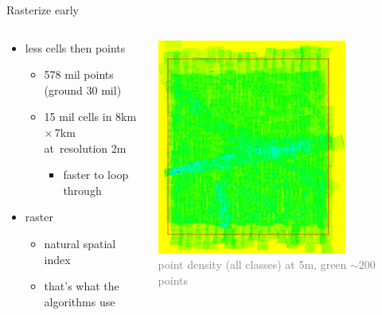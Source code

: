 \documentclass[xcolor={dvipsnames,usenames},beamer,aspectratio=169]{beamer}
\begin{document}
\begin{frame}{Rasterize early}

\begin{columns}
\begin{column}{0.4\textwidth}

\begin{itemize}
  \item less cells then points
  \begin{itemize}
    \item 578 mil points (ground 30 mil)
    \item 15 mil cells in 8km\,$\times$\,7km at~resolution 2m
    \begin{itemize}
    \item faster to loop through
    \end{itemize}
  \end{itemize}
  \item raster
  \begin{itemize}
    \item natural spatial index
    \item that's what the algorithms use
  \end{itemize}
\end{itemize}

\end{column}
\begin{column}{0.45\textwidth}

\begin{center}
  \includegraphics[width=0.75\textwidth]{grass/rinlidar_region}
  \\
  \tiny
  \textcolor{gray}{point density (all classes) at 5m, green $\sim200$ points}
\end{center}

\end{column}
\end{columns}

\end{frame}
\end{document}
